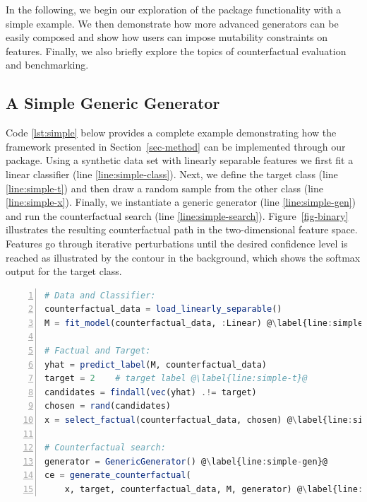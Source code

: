 \documentclass{juliacon}
\begin{document}
In the following, we begin our exploration of the package functionality
with a simple example. We then demonstrate how more advanced generators
can be easily composed and show how users can impose mutability
constraints on features. Finally, we also briefly explore the topics of
counterfactual evaluation and benchmarking.

\subsection{A Simple Generic Generator}\label{sec-simple}

Code \ref{lst:simple} below provides a complete example demonstrating
how the framework presented in Section~\ref{sec-method} can be
implemented through our package. Using a synthetic data set with
linearly separable features we first fit a linear classifier (line
\ref{line:simple-class}). Next, we define the target class (line
\ref{line:simple-t}) and then draw a random sample from the other class
(line \ref{line:simple-x}). Finally, we instantiate a generic generator
(line \ref{line:simple-gen}) and run the counterfactual search (line
\ref{line:simple-search}). Figure~\ref{fig-binary} illustrates the
resulting counterfactual path in the two-dimensional feature space.
Features go through iterative perturbations until the desired confidence
level is reached as illustrated by the contour in the background, which
shows the softmax output for the target class.

\begin{lstlisting}[language=Julia, escapechar=@, numbers=left, label={lst:simple}, caption={Standard workflow for generating counterfactuals.}] 
# Data and Classifier:
counterfactual_data = load_linearly_separable()
M = fit_model(counterfactual_data, :Linear) @\label{line:simple-class}@

# Factual and Target:
yhat = predict_label(M, counterfactual_data)
target = 2    # target label @\label{line:simple-t}@
candidates = findall(vec(yhat) .!= target)
chosen = rand(candidates)
x = select_factual(counterfactual_data, chosen) @\label{line:simple-x}@

# Counterfactual search:
generator = GenericGenerator() @\label{line:simple-gen}@
ce = generate_counterfactual(
    x, target, counterfactual_data, M, generator) @\label{line:simple-search}@
\end{lstlisting}
\end{document}
